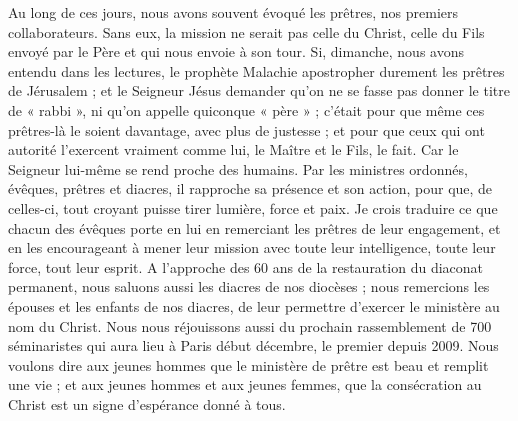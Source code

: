 \begin{itemize}
Au long de ces jours, nous avons souvent évoqué les prêtres, nos premiers collaborateurs. Sans eux, la mission ne serait pas celle du Christ, celle du Fils envoyé par le Père et qui nous envoie à son tour. Si, dimanche, nous avons entendu dans les lectures, le prophète Malachie apostropher durement les prêtres de Jérusalem ; et le Seigneur Jésus demander qu’on ne se fasse pas donner le titre de « rabbi », ni qu’on appelle quiconque « père » ; c’était pour que même ces prêtres-là le soient davantage, avec plus de justesse ; et pour que ceux qui ont autorité l’exercent vraiment comme lui, le Maître et le Fils, le fait. Car le Seigneur lui-même se rend proche des humains. Par les ministres ordonnés, évêques, prêtres et diacres, il rapproche sa présence et son action, pour que, de celles-ci, tout croyant puisse tirer lumière, force et paix. Je crois traduire ce que chacun des évêques porte en lui en remerciant les prêtres de leur engagement, et en les encourageant à mener leur mission avec toute leur intelligence, toute leur force, tout leur esprit. A l’approche des 60 ans de la restauration du diaconat permanent, nous saluons aussi les diacres de nos diocèses ; nous remercions les épouses et les enfants de nos diacres, de leur permettre d’exercer le ministère au nom du Christ. Nous nous réjouissons aussi du prochain rassemblement de 700 séminaristes qui aura lieu à Paris début décembre, le premier depuis 2009. Nous voulons dire aux jeunes hommes que le ministère de prêtre est beau et remplit une vie ; et aux jeunes hommes et aux jeunes femmes, que la consécration au Christ est un signe d’espérance donné à tous.

\end{itemize}
